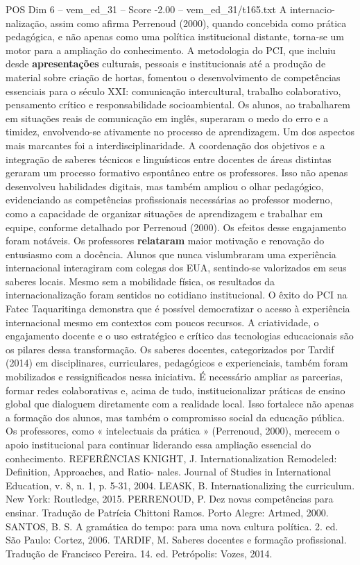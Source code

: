 \begin{textsample}{POS Dim 6 – vem\_ed\_31 – Score -2.00 – vem\_ed\_31/t165.txt}
A internacio- nalização, assim como afirma Perrenoud (2000), quando concebida como prática pedagógica, e não apenas como uma política institucional distante, torna-se um motor para a ampliação do conhecimento.
A metodologia do PCI, que incluiu desde \textbf{apresentações} culturais, pessoais e institucionais até a produção de material sobre criação de hortas, fomentou o desenvolvimento de competências essenciais para o século XXI: comunicação intercultural, trabalho colaborativo, pensamento crítico e responsabilidade socioambiental.
Os alunos, ao trabalharem em situações reais de comunicação em inglês, superaram o medo do erro e a timidez, envolvendo-se ativamente no processo de aprendizagem.
Um dos aspectos mais marcantes foi a interdisciplinaridade.
A coordenação dos objetivos e a integração de saberes técnicos e linguísticos entre docentes de áreas distintas geraram um processo formativo espontâneo entre os professores.
Isso não apenas desenvolveu habilidades digitais, mas também ampliou o olhar pedagógico, evidenciando as competências profissionais necessárias ao professor moderno, como a capacidade de organizar situações de aprendizagem e trabalhar em equipe, conforme detalhado por Perrenoud (2000).
Os efeitos desse engajamento foram notáveis.
Os professores \textbf{relataram} maior motivação e renovação do entusiasmo com a docência.
Alunos que nunca vislumbraram uma experiência internacional interagiram com colegas dos EUA, sentindo-se valorizados em seus saberes locais.
Mesmo sem a mobilidade física, os resultados da internacionalização foram sentidos no cotidiano institucional.
O êxito do PCI na Fatec Taquaritinga demonstra que é possível democratizar o acesso à experiência internacional mesmo em contextos com poucos recursos.
A criatividade, o engajamento docente e o uso estratégico e crítico das tecnologias educacionais são os pilares dessa transformação.
Os saberes docentes, categorizados por Tardif (2014) em disciplinares, curriculares, pedagógicos e experienciais, também foram mobilizados e ressignificados nessa iniciativa.
É necessário ampliar as parcerias, formar redes colaborativas e, acima de tudo, institucionalizar práticas de ensino global que dialoguem diretamente com a realidade local.
Isso fortalece não apenas a formação dos alunos, mas também o compromisso social da educação pública.
Os professores, como « intelectuais da prática » (Perrenoud, 2000), merecem o apoio institucional para continuar liderando essa ampliação essencial do conhecimento.
REFERÊNCIAS KNIGHT, J.
Internationalization Remodeled: Definition, Approaches, and Ratio- nales.
Journal of Studies in International Education, v. 8, n. 1, p. 5-31, 2004.
LEASK, B.
Internationalizing the curriculum.
New York: Routledge, 2015.
PERRENOUD, P.
Dez novas competências para ensinar.
Tradução de Patrícia Chittoni Ramos.
Porto Alegre: Artmed, 2000.
SANTOS, B.
S.
A gramática do tempo: para uma nova cultura política. 2. ed.
São Paulo: Cortez, 2006.
TARDIF, M.
Saberes docentes e formação profissional.
Tradução de Francisco Pereira. 14. ed.
Petrópolis: Vozes, 2014.

\end{textsample}
